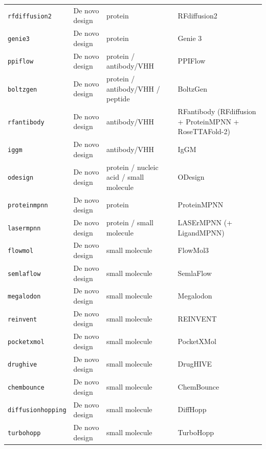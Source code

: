 \documentclass[11pt]{article}
\begin{document}
\begin{footnotesize}
\begin{longtable}{@{}>{\raggedright\arraybackslash}p{25mm}>{\raggedright\arraybackslash}p{26mm}>{\raggedright\arraybackslash}p{28mm}>{\raggedright\arraybackslash}p{70mm}@{}}
\texttt{rfdiffusion2} & De novo design & protein & RFdiffusion2 \citep{ahern_atom-level_2026,krishna_generalized_2024} \\
\texttt{genie3} & De novo design & protein & Genie 3 \citep{lin_fast_2026} \\
\texttt{ppiflow} & De novo design & protein / antibody/VHH & PPIFlow \citep{yu_high-affinity_2026} \\
\texttt{boltzgen} & De novo design & protein / antibody/VHH / peptide & BoltzGen \citep{stark_boltzgen_2025} \\
\texttt{rfantibody} & De novo design & antibody/VHH & RFantibody (RFdiffusion + ProteinMPNN + RoseTTAFold-2) \citep{bennett_atomically_2026,watson_novo_2023,dauparas_robust_2022,baek_accurate_2021} \\
\texttt{iggm} & De novo design & antibody/VHH & IgGM \citep{wang_iggm_2025} \\
\texttt{odesign} & De novo design & protein / nucleic acid / small molecule & ODesign \citep{zhang_odesign_2025} \\
\texttt{proteinmpnn} & De novo design & protein & ProteinMPNN \citep{dauparas_robust_2022} \\
\texttt{lasermpnn} & De novo design & protein / small molecule & LASErMPNN (+ LigandMPNN) \citep{fry_zero-shot_2026,dauparas_robust_2022} \\
\texttt{flowmol} & De novo design & small molecule & FlowMol3 \citep{dunn_flowmol3_2025} \\
\texttt{semlaflow} & De novo design & small molecule & SemlaFlow \citep{irwin_semlaflow_2025} \\
\texttt{megalodon} & De novo design & small molecule & Megalodon \citep{reidenbach_applications_2025} \\
\texttt{reinvent} & De novo design & small molecule & REINVENT \citep{loeffler_reinvent_2024,blaschke_reinvent_2020} \\
\texttt{pocketxmol} & De novo design & small molecule & PocketXMol \citep{peng_unified_2026} \\
\texttt{drughive} & De novo design & small molecule & DrugHIVE \citep{weller_structure-based_2024} \\
\texttt{chembounce} & De novo design & small molecule & ChemBounce \citep{jang_chembounce_2025} \\
\texttt{diffusion\-hopping} & De novo design & small molecule & DiffHopp \citep{torge_diffhopp_2023} \\
\texttt{turbohopp} & De novo design & small molecule & TurboHopp \citep{yoo_turbohopp_2024} \\

\end{longtable}
\end{footnotesize}
\end{document}
